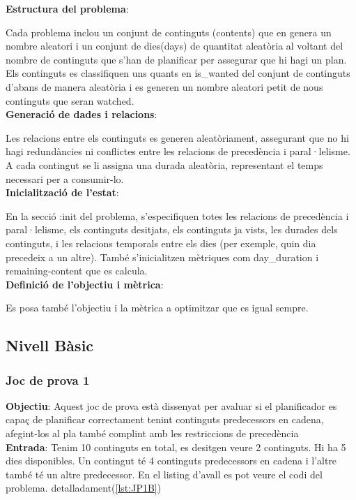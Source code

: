 \documentclass[a4paper]{article}
\begin{document}
	\noindent \textbf{Estructura del problema}:
	
	Cada problema inclou un conjunt de continguts (contents) que en genera un nombre aleatori  i un conjunt de dies(days) de quantitat aleatòria al voltant del nombre de continguts que s'han de planificar per assegurar que hi hagi un plan. Els continguts es classifiquen uns quants en is\_wanted del conjunt de continguts d'abans de manera aleatòria i es generen un nombre aleatori petit de nous continguts que seran watched. \\
	
	\noindent \textbf{Generació de dades i relacions}:
	
	Les relacions entre els continguts es generen aleatòriament, assegurant que no hi hagi redundàncies ni conflictes entre les relacions de precedència i paral·lelisme. A cada contingut se li assigna una durada aleatòria, representant el temps necessari per a consumir-lo. \\
	
	\noindent \textbf{Inicialització de l'estat}:
	
	En la secció :init del problema, s'especifiquen totes les relacions de precedència i paral·lelisme, els continguts desitjats, els continguts ja vists, les durades dels continguts, i les relacions temporals entre els dies (per exemple, quin dia precedeix a un altre). També s'inicialitzen mètriques com day\_duration i remaining-content que es calcula. \\
	
	\noindent \textbf{Definició de l'objectiu i mètrica}:
	
	Es posa també l'objectiu i la mètrica a optimitzar que es igual sempre.	
	
	\subsection{Nivell Bàsic}
	
	\subsubsection*{Joc de prova 1}
	\noindent \textbf{Objectiu}: Aquest joc de prova està dissenyat per avaluar si el planificador es capaç de planificar correctament tenint continguts predecessors en cadena, afegint-los al pla també complint amb les restriccions de precedència \\
	
	\noindent \textbf{Entrada}: Tenim 10 continguts en total, es desitgen veure 2 continguts. Hi ha 5 dies disponibles. Un contingut té 4 continguts predecessors en cadena i l'altre també té un altre predecessor. En el listing d'avall es pot veure el codi del problema.  detalladament(\ref{lst:JP1B}) \\
	
\end{document}
